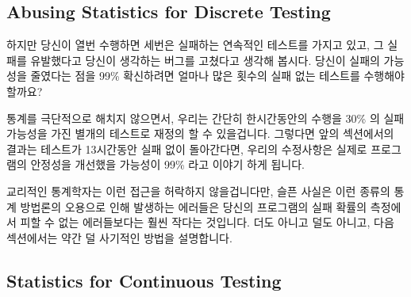 \subsection{Abusing Statistics for Discrete Testing}
\label{sec:debugging:Abusing Statistics for Discrete Testing}

하지만 당신이 열번 수행하면 세번은 실패하는 연속적인 테스트를 가지고 있고, 그
실패를 유발했다고 당신이 생각하는 버그를 고쳤다고 생각해 봅시다.
당신이 실패의 가능성을 줄였다는 점을 99\% 확신하려면 얼마나 많은 횟수의 실패
없는 테스트를 수행해야 할까요?

통계를 극단적으로 해치지 않으면서, 우리는 간단히 한시간동안의 수행을 30\% 의
실패 가능성을 가진 별개의 테스트로 재정의 할 수 있을겁니다.
그렇다면 앞의 섹션에서의 결과는 테스트가 13시간동안 실패 없이 돌아간다면,
우리의 수정사항은 실제로 프로그램의 안정성을 개선했을 가능성이 99\% 라고 이야기
하게 됩니다.

교리적인 통계학자는 이런 접근을 허락하지 않을겁니다만, 슬픈 사실은 이런 종류의
통계 방법론의 오용으로 인해 발생하는 에러들은 당신의 프로그램의 실패 확률의
측정에서 피할 수 없는 에러들보다는 훨씬 작다는 것입니다.
더도 아니고 덜도 아니고, 다음 섹션에서는 약간 덜 사기적인 방법을 설명합니다.

\subsection{Statistics for Continuous Testing}
\label{sec:debuggingStatistics for Continuous Testing}

